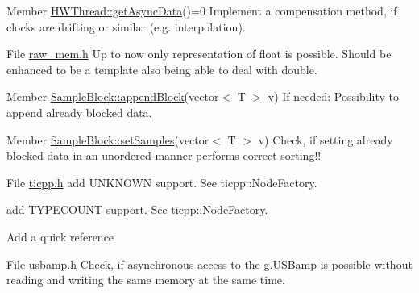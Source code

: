 \label{todo__todo000009}
\hypertarget{todo__todo000009}{}
 
\begin{DoxyDescription}
\item[Member \hyperlink{class_h_w_thread_aa709526a915411a495a947f6bc6e06f9}{HWThread::getAsyncData}()=0 ]Implement a compensation method, if clocks are drifting or similar (e.g. interpolation). 
\end{DoxyDescription}

\label{todo__todo000010}
\hypertarget{todo__todo000010}{}
 
\begin{DoxyDescription}
\item[File \hyperlink{raw__mem_8h}{raw\_\-mem.h} ]Up to now only representation of float is possible. Should be enhanced to be a template also being able to deal with double.


\end{DoxyDescription}

\label{todo__todo000011}
\hypertarget{todo__todo000011}{}
 
\begin{DoxyDescription}
\item[Member \hyperlink{class_sample_block_afad40888932bc8378a7598fd2546317c}{SampleBlock::appendBlock}(vector$<$ T $>$ v) ]If needed: Possibility to append already blocked data. 
\end{DoxyDescription}

\label{todo__todo000012}
\hypertarget{todo__todo000012}{}
 
\begin{DoxyDescription}
\item[Member \hyperlink{class_sample_block_acb823540844a192e12069a065cc607e8}{SampleBlock::setSamples}(vector$<$ T $>$ v) ]Check, if setting already blocked data in an unordered manner performs correct sorting!! 
\end{DoxyDescription}

\label{todo__todo000014}
\hypertarget{todo__todo000014}{}
 
\begin{DoxyDescription}
\item[File \hyperlink{ticpp_8h}{ticpp.h} ]add UNKNOWN support. See ticpp::NodeFactory. 

add TYPECOUNT support. See ticpp::NodeFactory. 

Add a quick reference 
\end{DoxyDescription}

\label{todo__todo000013}
\hypertarget{todo__todo000013}{}
 
\begin{DoxyDescription}
\item[File \hyperlink{usbamp_8h}{usbamp.h} ]Check, if asynchronous access to the g.USBamp is possible without reading and writing the same memory at the same time.


\end{DoxyDescription}